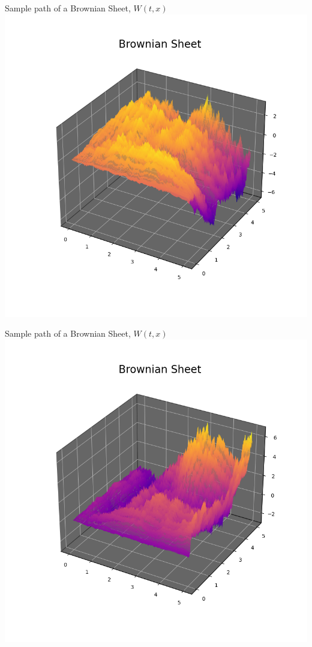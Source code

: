 \documentclass{beamer}%
\numberwithin{equation}{section}
\begin{document}
\begin{frame}{Sample path of a Brownian Sheet, $W(t,x)$}
	\centering
	\includegraphics[scale=.5]{bsheet3.png}
\end{frame}

\begin{frame}{Sample path of a Brownian Sheet, $W(t,x)$}
	\centering
	\includegraphics[scale=.5]{bsheet1.png}
\end{frame}
\end{document}
